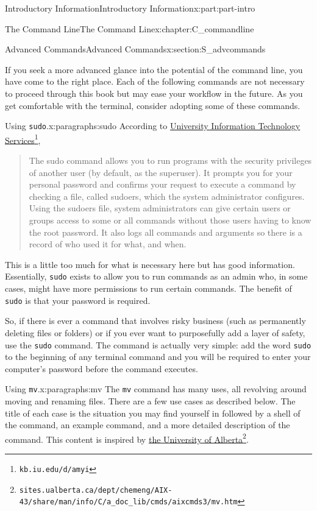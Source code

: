\documentclass[oneside,10pt,]{book}
\newcommand{\mono}[1]{\texttt{#1}}
\begin{document}
\begin{partptx}{Introductory Information}{}{Introductory Information}{}{}{x:part:part-intro}
\begin{chapterptx}{The Command Line}{}{The Command Line}{}{}{x:chapter:C_commandline}
\begin{sectionptx}{Advanced Commands}{}{Advanced Commands}{}{}{x:section:S_advcommands}
\begin{introduction}{}
If you seek a more advanced glance into the potential of the command line, you have come to the right place. Each of the following commands are not necessary to proceed through this book but may ease your workflow in the future. As you get comfortable with the terminal, consider adopting some of these commands.%
\end{introduction}%
\begin{paragraphs}{Using \mono{sudo}.}{x:paragraphs:sudo}%
%
%
According to \href{https://kb.iu.edu/d/amyi}{University Information Technology Services}\footnote{\nolinkurl{kb.iu.edu/d/amyi}\label{g:fn:idm480424568}}, \begin{quote}%
The sudo command allows you to run programs with the security privileges of another user (by default, as the superuser). It prompts you for your personal password and confirms your request to execute a command by checking a file, called sudoers, which the system administrator configures. Using the sudoers file, system administrators can give certain users or groups access to some or all commands without those users having to know the root password. It also logs all commands and arguments so there is a record of who used it for what, and when.\end{quote}
%
\par
This is a little too much for what is necessary here but has good information. Essentially, \mono{sudo} exists to allow you to run commands as an admin who, in some cases, might have more permissions to run certain commands. The benefit of \mono{sudo} is that your password is required.%
\par
So, if there is ever a command that involves risky business (such as permanently deleting files or folders) or if you ever want to purposefully add a layer of safety, use the \mono{sudo} command. The command is actually very simple: add the word \mono{sudo} to the beginning of any terminal command and you will be required to enter your computer's password before the command executes.%
\end{paragraphs}%
\begin{paragraphs}{Using \mono{mv}.}{x:paragraphs:mv}%
%
%
%
%
The \mono{mv} command has many uses, all revolving around moving and renaming files. There are a few use cases as described below. The title of each case is the situation you may find yourself in followed by a shell of the command, an example command, and a more detailed description of the command. This content is inspired by \href{https://sites.ualberta.ca/dept/chemeng/AIX-43/share/man/info/C/a_doc_lib/cmds/aixcmds3/mv.htm}{the University of Alberta}\footnote{\nolinkurl{sites.ualberta.ca/dept/chemeng/AIX-43/share/man/info/C/a_doc_lib/cmds/aixcmds3/mv.htm}\label{g:fn:idm480420728}}.%

\end{paragraphs}
\end{sectionptx}
\end{chapterptx}
\end{partptx}
\end{document}
